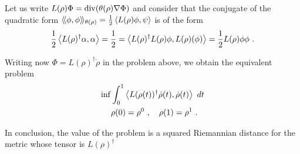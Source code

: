 \documentclass[12pt,a4paper]{amsart}
\theoremstyle{definition}
\begin{document}
Let us write $L(\rho)\Phi = \operatorname*{div}(\theta(\rho)\nabla \Phi)$ and
consider that the conjugate of the quadratic form
$\left\langle\!\langle\phi,\phi\right\rangle\!\rangle_{\theta(\rho)} = \frac 12 \left\langle L(\rho)\phi,\psi\right\rangle$ is of the form
\begin{equation*}
  \frac 12 \left\langle L(\rho)^\dagger \alpha,\alpha\right\rangle = \frac12 =
  \left\langle L(\rho)^\dagger L(\rho) \phi,L(\rho)(\phi)\right\rangle = \frac12
  {L(\rho) \phi} \phi \ . 
\end{equation*}

Writing now $\Phi = L(\rho)^\dagger \dot \rho$ in the problem above,
we obtain the equivalent problem
\begin{align*}
 \inf &\int_0^1 \left\langle L(\rho(t))^\dagger \dot \rho(t),\dot \rho(t)\right\rangle \ dt
 \\
 &\rho(0) = \rho^0 \ , \quad \rho(1) = \rho^1 \ .
\end{align*}

In conclusion, the value of the problem is a squared Riemannian
distance for the metric whose tensor is $L(\rho)^\dagger$



\end{document}
